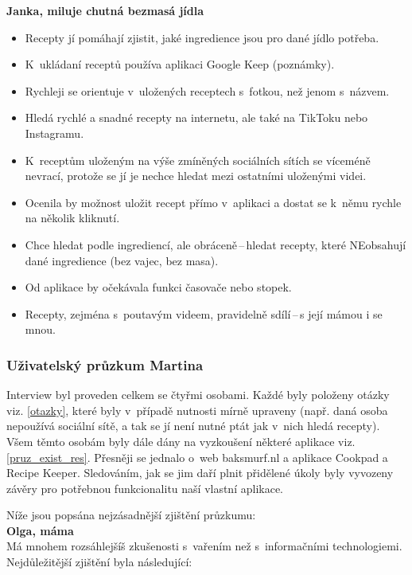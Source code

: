 \documentclass[a4paper, 11pt]{article}
\newcommand{\sss}[1]{\subsubsection{#1}} %
\begin{document}
    \noindent\textbf{Janka, miluje chutná bezmasá jídla}
    \begin{itemize}
        \item Recepty jí pomáhají zjistit, jaké ingredience jsou pro dané jídlo potřeba.
        \item K~ukládaní receptů používa aplikaci Google Keep (poznámky).
        \item Rychleji se orientuje v~uložených receptech s~fotkou, než jenom s~názvem.
        \item Hledá rychlé a snadné recepty na internetu, ale také na TikToku nebo Instagramu.
        \item K~receptům uloženým na výše zmíněných sociálních sítích se víceméně nevrací,
        protože se jí je nechce hledat mezi ostatními uloženými videi.
        \item Ocenila by možnost uložit recept přímo v~aplikaci a dostat se k~němu rychle na několik kliknutí.
        \item Chce hledat podle ingrediencí, ale obráceně\,--\,hledat recepty, které NEobsahují dané
        ingredience (bez vajec, bez masa).
        \item Od aplikace by očekávala funkci časovače nebo stopek.
        \item Recepty, zejména s~poutavým videem, pravidelně sdílí\,--\,s její mámou i se mnou.
    \end{itemize}


    \sss{Uživatelský průzkum Martina}

    Interview byl proveden celkem se čtyřmi osobami. Každé byly položeny otázky
    viz. \ref{otazky}, které byly v~případě nutnosti mírně upraveny (např. daná osoba nepoužívá sociální sítě,
    a tak se jí není nutné ptát jak v~nich hledá recepty). Všem těmto osobám byly dále
    dány na vyzkoušení některé aplikace viz. \ref{pruz_exist_res}. Přesněji se jednalo o~web
    baksmurf.nl a aplikace Cookpad a Recipe Keeper. Sledováním, jak se jim daří plnit přidělené úkoly
    byly vyvozeny závěry pro potřebnou funkcionalitu naší vlastní aplikace.

    Níže jsou popsána nejzásadnější zjištění průzkumu: \\

    \noindent\textbf{Olga, máma} \\[-1em]

    Má mnohem rozsáhlejšíš zkušenosti s~vařením než s~informačními technologiemi.
    Nejdůležitější zjištění byla následující:
\end{document}
